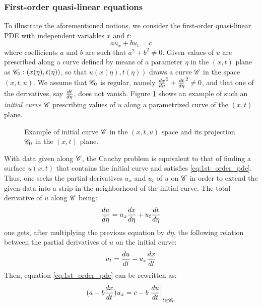 \subsubsection*{First-order quasi-linear equations}
To illustrate the aforementioned notions, we consider the first-order quasi-linear PDE with independent variables $x$ and $t$:
\begin{equation}
  \label{eq:1st_order_pde}
   a u_x + b u_t  = c
\end{equation}
where coefficients $a$ and $b$ are such that $a^2 + b^2 \neq 0$. Given values of $u$ are prescribed along a curve defined by means of a parameter $\eta$ in the $(x,t)$ plane as $\mathscr{C}_0:(x(\eta),t(\eta))$, so that $u(x(\eta),t(\eta))$ draws a curve $\mathscr{C}$ in the space $(x,t,u)$. 
We assume that $\mathscr{C}_0$ is regular, namely $\frac{d x}{d \eta}^2 + \frac{d t}{d \eta}^2 \neq 0$, and that one of the derivatives, say $\frac{d t}{d \eta}$, does not vanish. Figure \ref{fig:initial_curve} shows an example of such an \textit{initial curve} $\mathscr{C}$ prescribing values of $u$ along a parametrized curve of the $(x,t)$ plane.
\begin{figure}[h]
  \centering
  
  \caption{Example of initial curve $\mathscr{C}$ in the $(x,t,u)$ space and its projection $\mathscr{C}_0$ in the $(x,t)$ plane.}
  \label{fig:initial_curve}
\end{figure}
With data given along $\mathscr{C}$, the Cauchy problem is equivalent to that of finding a surface $u(x,t)$ that contains the initial curve and satisfies \eqref{eq:1st_order_pde}.
Thus, one seeks the partial derivatives $u_x$ and $u_t$ of $u$ on $\mathscr{C}$ in order to extend the given data into a strip in the neighborhood of the initial curve.
The total derivative of $u$ along $\mathscr{C}$ being:
\begin{equation}
  \label{eq:dtot_u}
  \frac{d u}{d \eta}=u_x\frac{d x}{d \eta}+u_t\frac{d t}{d \eta}
\end{equation}
one gets, after multiplying the previous equation by $d\eta$, the following relation between the partial derivatives of $u$ on the initial curve:
\begin{equation*}
  u_t= \frac{d u}{d t} - u_x\frac{d x}{d t}
\end{equation*}
Then, equation \eqref{eq:1st_order_pde} can be rewritten as:
\begin{equation}
  \label{eq:normal_form_pde}
  (a - b\frac{d x}{d t})u_x = c - b\left.\frac{d u}{d t}\right|_{t\in\mathscr{C}_0}
\end{equation}
